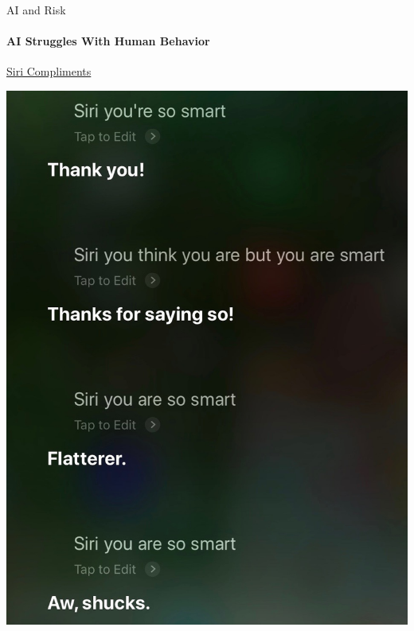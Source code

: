 \begin{frame}{AI and Risk}
  \framesubtitle{AI Struggles With Human Behavior}
  \href{run:graphics/siri_smart_sarcasm.m4a}{Siri Compliments}

  \begin{center}
    \includegraphics[height=0.7\textheight]{graphics/siri_transcript}
  \end{center}
\end{frame}

